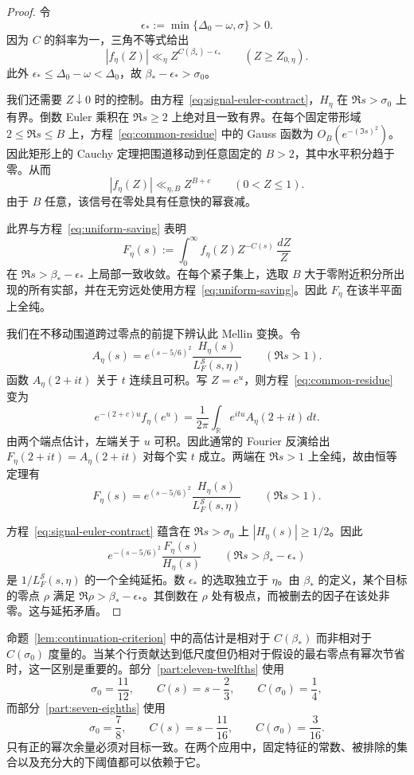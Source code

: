 \documentclass[11pt,a4paper]{article}
\numberwithin{equation}{section}
\numberwithin{figure}{section}
\theoremstyle{definition}
\theoremstyle{remark}
\begin{document}
\begin{proof}
令
\[
 \epsilon_*:=\min\{\Delta_0-\omega,\sigma\}>0.
\]
因为 $C$ 的斜率为一，三角不等式给出
\begin{equation}
 |f_\eta(Z)|\ll_\eta Z^{C(\beta_*)-\epsilon_*}
 \qquad (Z\ge Z_{0,\eta}).
 \label{eq:uniform-saving}
\end{equation}
此外 $\epsilon_*\le\Delta_0-\omega<\Delta_0$，故 $\beta_*-\epsilon_*>\sigma_0$。

我们还需要 $Z\downarrow0$ 时的控制。由方程~\eqref{eq:signal-euler-contract}，$H_\eta$ 在 $\Re s>\sigma_0$ 上有界。倒数 Euler 乘积在 $\Re s\ge2$ 上绝对且一致有界。在每个固定带形域 $2\le\Re s\le B$ 上，方程~\eqref{eq:common-residue} 中的 Gauss 函数为 $O_B(e^{-(\Im s)^2})$。因此矩形上的 Cauchy 定理把围道移动到任意固定的 $B>2$，其中水平积分趋于零。从而
\[
 |f_\eta(Z)|\ll_{\eta,B}Z^{B+c}\qquad(0<Z\le1).
\]
由于 $B$ 任意，该信号在零处具有任意快的幂衰减。

此界与方程~\eqref{eq:uniform-saving} 表明
\[
 F_\eta(s):=\int_0^\infty f_\eta(Z)Z^{-C(s)}\,\frac{dZ}{Z}
\]
在 $\Re s>\beta_*-\epsilon_*$ 上局部一致收敛。在每个紧子集上，选取 $B$ 大于零附近积分所出现的所有实部，并在无穷远处使用方程~\eqref{eq:uniform-saving}。因此 $F_\eta$ 在该半平面上全纯。

我们在不移动围道跨过零点的前提下辨认此 Mellin 变换。令
\[
 A_\eta(s)=e^{(s-5/6)^2}
             \frac{H_\eta(s)}{L_F^{\mathcal S}(s,\eta)}
 \qquad(\Re s>1).
\]
函数 $A_\eta(2+it)$ 关于 $t$ 连续且可积。写 $Z=e^u$，则方程~\eqref{eq:common-residue} 变为
\[
 e^{-(2+c)u}f_\eta(e^u)
   =\frac1{2\pi}\int_{\mathbb R}e^{itu}A_\eta(2+it)\,dt.
\]
由两个端点估计，左端关于 $u$ 可积。因此通常的 Fourier 反演给出 $F_\eta(2+it)=A_\eta(2+it)$ 对每个实 $t$ 成立。两端在 $\Re s>1$ 上全纯，故由恒等定理有
\[
 F_\eta(s)=e^{(s-5/6)^2}
             \frac{H_\eta(s)}{L_F^{\mathcal S}(s,\eta)}
 \qquad(\Re s>1).
\]

方程~\eqref{eq:signal-euler-contract} 蕴含在 $\Re s>\sigma_0$ 上 $|H_\eta(s)|\ge1/2$。因此
\[
 e^{-(s-5/6)^2}\frac{F_\eta(s)}{H_\eta(s)}
 \qquad(\Re s>\beta_*-\epsilon_*)
\]
是 $1/L_F^{\mathcal S}(s,\eta)$ 的一个全纯延拓。数 $\epsilon_*$ 的选取独立于 $\eta$。由 $\beta_*$ 的定义，某个目标的零点 $\rho$ 满足 $\Re\rho>\beta_*-\epsilon_*$。其倒数在 $\rho$ 处有极点，而被删去的因子在该处非零。这与延拓矛盾。
\end{proof}

命题~\ref{lem:continuation-criterion} 中的高估计是相对于 $C(\beta_*)$ 而非相对于 $C(\sigma_0)$ 度量的。当某个行贡献达到低尺度但仍相对于假设的最右零点有幂次节省时，这一区别是重要的。部分~\ref{part:eleven-twelfths} 使用
\[
 \sigma_0=\frac{11}{12},\qquad C(s)=s-\frac23,
 \qquad C(\sigma_0)=\frac14,
\]
而部分~\ref{part:seven-eighths} 使用
\[
 \sigma_0=\frac78,\qquad C(s)=s-\frac{11}{16},
 \qquad C(\sigma_0)=\frac3{16}.
\]
只有正的幂次余量必须对目标一致。在两个应用中，固定特征的常数、被排除的集合以及充分大的下阈值都可以依赖于它。
\end{document}
